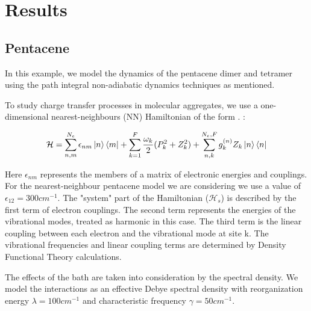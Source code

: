 
\chapter{Results} %

\label{Chapter6} %


\section{Pentacene}

In this example, we model the dynamics of the pentacene dimer and tetramer using the path integral non-adiabatic dynamics techniques as mentioned.

To study charge transfer processes in molecular aggregates, we use a one-dimensional nearest-neighbours (NN) Hamiltonian of the form \cite{borrelli}. :

\begin{equation} \label{6.x}    
    \mathcal{H} = \sum_{n, m}^{N_e} \epsilon_{nm} \ket{n} \bra{m} + \sum_{k = 1}^{F} \frac{\omega_k}{2} (P_k^{2} + Z_k^{2}) + \sum_{n, k}^{N_e, F} g_k^{(n)} Z_k \ket{n}\bra{n}
\end{equation}

Here $\epsilon_{nm}$ represents the members of a matrix of electronic energies and couplings. For the nearest-neighbour pentacene model we are considering we use a value of $\epsilon_{12} = 300 cm^{-1}$. The "system" part of the Hamiltonian ($\mathcal{H}_s$) is described by the first term of electron couplings. The second term represents the energies of the vibrational modes, treated as harmonic in this case. The third term is the linear coupling between each electron and the vibrational mode at site k. The vibrational frequencies and linear coupling terms are determined by Density Functional Theory calculations. 

The effects of the bath are taken into consideration by the spectral density. We model the interactions as an effective Debye spectral density with reorganization energy $\lambda = 100 cm^{-1}$ and characteristic frequency $\gamma = 50 cm^{-1}$.

